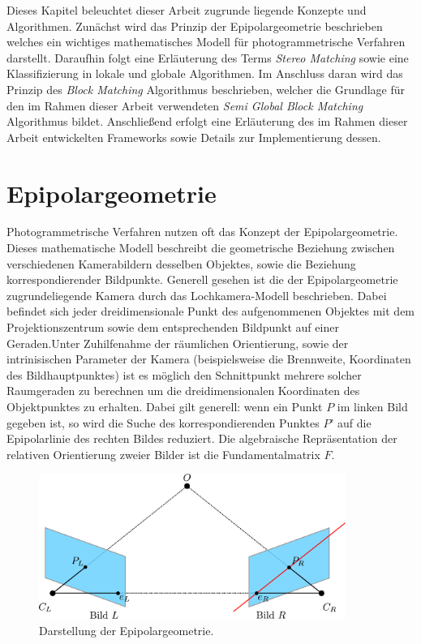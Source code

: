 Dieses Kapitel beleuchtet dieser Arbeit zugrunde liegende Konzepte und Algorithmen. Zunächst wird das Prinzip der Epipolargeometrie beschrieben welches ein wichtiges mathematisches Modell für photogrammetrische Verfahren darstellt. Daraufhin folgt eine Erläuterung des Terms \emph{Stereo Matching} sowie eine Klassifizierung in lokale und globale Algorithmen. Im Anschluss daran wird das Prinzip des \emph{Block Matching} Algorithmus beschrieben, welcher die Grundlage für den im Rahmen dieser Arbeit verwendeten \emph{Semi Global Block Matching} Algorithmus bildet. Anschließend erfolgt eine Erläuterung des im Rahmen dieser Arbeit entwickelten Frameworks sowie Details zur Implementierung dessen.

\section{Epipolargeometrie}
\label{sec:epipolargeometrie}
Photogrammetrische Verfahren nutzen oft das Konzept der Epipolargeometrie. Dieses mathematische Modell beschreibt die geometrische Beziehung zwischen verschiedenen Kamerabildern desselben Objektes, sowie die Beziehung korrespondierender Bildpunkte. Generell gesehen ist die der Epipolargeometrie zugrundeliegende Kamera durch das Lochkamera-Modell beschrieben. Dabei befindet sich jeder dreidimensionale Punkt des aufgenommenen Objektes mit dem Projektionszentrum sowie dem entsprechenden Bildpunkt auf einer Geraden.Unter Zuhilfenahme der räumlichen Orientierung, sowie der intrinisischen Parameter der Kamera (beispielsweise die Brennweite, Koordinaten des Bildhauptpunktes) ist es möglich den Schnittpunkt mehrere solcher Raumgeraden zu berechnen um die dreidimensionalen Koordinaten des Objektpunktes zu erhalten. Dabei gilt generell: wenn ein Punkt $P$ im linken Bild gegeben ist, so wird die Suche des korrespondierenden Punktes $P’$ auf die Epipolarlinie des rechten Bildes reduziert. Die algebraische Repräsentation der relativen Orientierung zweier Bilder ist die Fundamentalmatrix $F$. 

\begin{figure}[h]
	\begin{center}
		\includegraphics[width=10cm]{img/epipolar_geometry.pdf}
	\end{center}
	\caption{Darstellung der Epipolargeometrie.}
	\label{fig:epipolar_geometry}
\end{figure}

